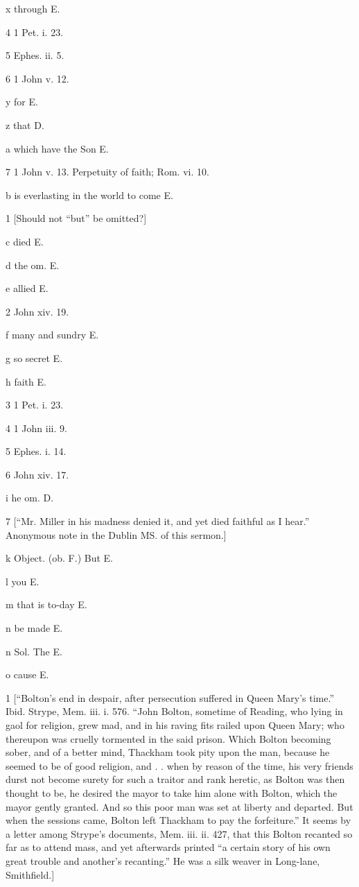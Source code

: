 x
through E.

4
1 Pet. i. 23.

5
Ephes. ii. 5.

6
1 John v. 12.

y
for E.

z
that D.

a
which have the Son E.

7
1 John v. 13. Perpetuity of faith; Rom. vi. 10.

b
is everlasting in the world to come E.

1
[Should not “but” be omitted?]

c
died E.

d
the om. E.

e
allied E.

2
John xiv. 19.

f
many and sundry E.

g
so secret E.

h
faith E.

3
1 Pet. i. 23.

4
1 John iii. 9.

5
Ephes. i. 14.

6
John xiv. 17.

i
he om. D.

7
[“Mr. Miller in his madness denied it, and yet died faithful as I hear.” Anonymous note in the Dublin MS. of this sermon.]

k
Object. (ob. F.) But E.

l
you E.

m
that is to-day E.

n
be made E.

n
Sol. The E.

o
cause E.

1
[“Bolton’s end in despair, after persecution suffered in Queen Mary’s time.” Ibid. Strype, Mem. iii. i. 576. “John Bolton, sometime of Reading, who lying in gaol for religion, grew mad, and in his raving fits railed upon Queen Mary; who thereupon was cruelly tormented in the said prison. Which Bolton becoming sober, and of a better mind, Thackham took pity upon the man, because he seemed to be of good religion, and . . when by reason of the time, his very friends durst not become surety for such a traitor and rank heretic, as Bolton was then thought to be, he desired the mayor to take him alone with Bolton, which the mayor gently granted. And so this poor man was set at liberty and departed. But when the sessions came, Bolton left Thackham to pay the forfeiture.” It seems by a letter among Strype’s documents, Mem. iii. ii. 427, that this Bolton recanted so far as to attend mass, and yet afterwards printed “a certain story of his own great trouble and another’s recanting.” He was a silk weaver in Long-lane, Smithfield.]


